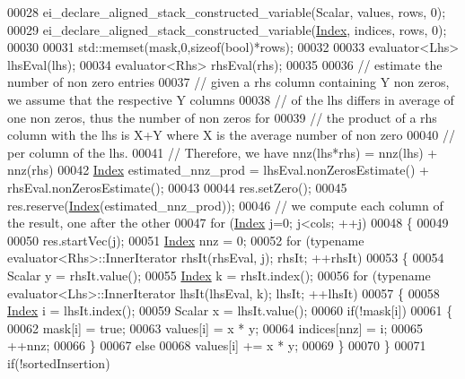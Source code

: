 \begin{DoxyCode}
00028   ei\_declare\_aligned\_stack\_constructed\_variable(Scalar, values,   rows, 0);
00029   ei\_declare\_aligned\_stack\_constructed\_variable(\hyperlink{namespace_eigen_a62e77e0933482dafde8fe197d9a2cfde}{Index},  indices,  rows, 0);
00030   
00031   std::memset(mask,0,\textcolor{keyword}{sizeof}(\textcolor{keywordtype}{bool})*rows);
00032 
00033   evaluator<Lhs> lhsEval(lhs);
00034   evaluator<Rhs> rhsEval(rhs);
00035   
00036   \textcolor{comment}{// estimate the number of non zero entries}
00037   \textcolor{comment}{// given a rhs column containing Y non zeros, we assume that the respective Y columns}
00038   \textcolor{comment}{// of the lhs differs in average of one non zeros, thus the number of non zeros for}
00039   \textcolor{comment}{// the product of a rhs column with the lhs is X+Y where X is the average number of non zero}
00040   \textcolor{comment}{// per column of the lhs.}
00041   \textcolor{comment}{// Therefore, we have nnz(lhs*rhs) = nnz(lhs) + nnz(rhs)}
00042   \hyperlink{namespace_eigen_a62e77e0933482dafde8fe197d9a2cfde}{Index} estimated\_nnz\_prod = lhsEval.nonZerosEstimate() + rhsEval.nonZerosEstimate();
00043 
00044   res.setZero();
00045   res.reserve(\hyperlink{namespace_eigen_a62e77e0933482dafde8fe197d9a2cfde}{Index}(estimated\_nnz\_prod));
00046   \textcolor{comment}{// we compute each column of the result, one after the other}
00047   \textcolor{keywordflow}{for} (\hyperlink{namespace_eigen_a62e77e0933482dafde8fe197d9a2cfde}{Index} j=0; j<cols; ++j)
00048   \{
00049 
00050     res.startVec(j);
00051     \hyperlink{namespace_eigen_a62e77e0933482dafde8fe197d9a2cfde}{Index} nnz = 0;
00052     \textcolor{keywordflow}{for} (\textcolor{keyword}{typename} evaluator<Rhs>::InnerIterator rhsIt(rhsEval, j); rhsIt; ++rhsIt)
00053     \{
00054       Scalar y = rhsIt.value();
00055       \hyperlink{namespace_eigen_a62e77e0933482dafde8fe197d9a2cfde}{Index} k = rhsIt.index();
00056       \textcolor{keywordflow}{for} (\textcolor{keyword}{typename} evaluator<Lhs>::InnerIterator lhsIt(lhsEval, k); lhsIt; ++lhsIt)
00057       \{
00058         \hyperlink{namespace_eigen_a62e77e0933482dafde8fe197d9a2cfde}{Index} i = lhsIt.index();
00059         Scalar x = lhsIt.value();
00060         \textcolor{keywordflow}{if}(!mask[i])
00061         \{
00062           mask[i] = \textcolor{keyword}{true};
00063           values[i] = x * y;
00064           indices[nnz] = i;
00065           ++nnz;
00066         \}
00067         \textcolor{keywordflow}{else}
00068           values[i] += x * y;
00069       \}
00070     \}
00071     \textcolor{keywordflow}{if}(!sortedInsertion)

\end{DoxyCode}
